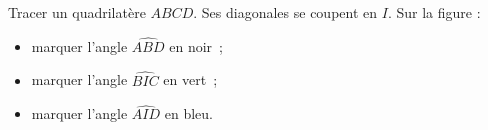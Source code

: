 \par Tracer un quadrilatère $ABCD$. Ses diagonales se coupent en $I$. Sur la figure :
\begin{itemize}
\item marquer l'angle $\widehat{ABD}$ en noir ;
\item marquer l'angle $\widehat{BIC}$ en vert ;
\item marquer l'angle $\widehat{AID}$ en bleu.
\end{itemize}